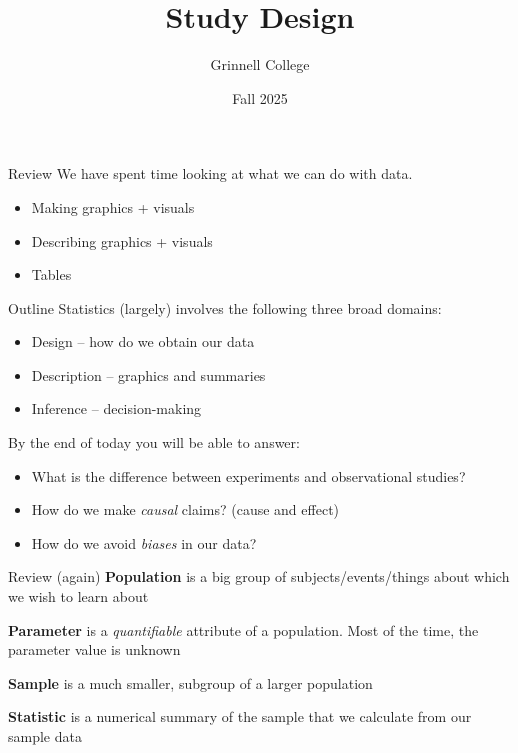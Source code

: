 \documentclass{beamer}
\title[STA-209]{Study Design}
\subtitle{}
\author{Grinnell College}
\date{Fall 2025}
\begin{document}
\begin{frame}
  \titlepage
\end{frame}



\begin{frame}{Review}
We have spent time looking at what we can do with data.
\begin{itemize}
    \item Making graphics + visuals
    \item Describing graphics + visuals
    \item Tables
\end{itemize}
\end{frame}

\begin{frame}{Outline}
Statistics (largely) involves the following three broad domains:
\begin{itemize}
    \item Design -- how do we obtain our data
    \item Description -- graphics and summaries
    \item Inference -- decision-making
\end{itemize} \vspace{8mm}

By the end of today you will be able to answer:
\begin{itemize}
    \item What is the difference between experiments and observational studies?
    \item How do we make \textit{causal} claims? (cause and effect)
    \item How do we avoid \textit{biases} in our data?
\end{itemize}
\end{frame}



\begin{frame}{Review (again)}
\textbf{Population} is a big group of subjects/events/things about which we wish to learn about \vspace{4mm}

\textbf{Parameter} is a \textit{quantifiable} attribute of a population. Most of the time, the parameter value is unknown \vspace{10mm}

\textbf{Sample} is a much smaller, subgroup of a larger population \vspace{4mm}

\textbf{Statistic} is a numerical summary of the sample that we calculate from our sample data
\end{frame}
\end{document}
